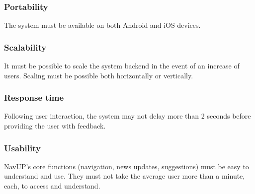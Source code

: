 \documentclass[12pt, a4paper]{article}
\begin{document}
		\subsubsection{Portability} The system must be available on both Android and iOS devices.
		\subsubsection{Scalability} It must be possible to scale the system backend in the event of an increase of users. Scaling must be possible both horizontally or vertically.
		\subsubsection{Response time} Following user interaction, the system may not delay more than 2 seconds before providing the user with feedback.
		\subsubsection{Usability} NavUP's core functions (navigation, news updates, suggestions) must be easy to understand and use. They must not take the average user more than a minute, each, to access and understand. 
\end{document}
